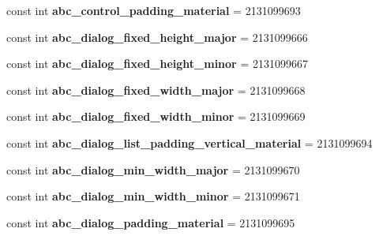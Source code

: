 \begin{DoxyCompactItemize}
const int {\bfseries abc\+\_\+control\+\_\+padding\+\_\+material} = 2131099693
\item 
\mbox{\label{classXaria_1_1Resource_1_1Dimension_a78b26df6c32795a79d6bf8ed56660889}} 
const int {\bfseries abc\+\_\+dialog\+\_\+fixed\+\_\+height\+\_\+major} = 2131099666
\item 
\mbox{\label{classXaria_1_1Resource_1_1Dimension_acc1848f42624bc33325a4bb517004e51}} 
const int {\bfseries abc\+\_\+dialog\+\_\+fixed\+\_\+height\+\_\+minor} = 2131099667
\item 
\mbox{\label{classXaria_1_1Resource_1_1Dimension_a1d492d1410acce7e4bc8ad8d3e0eb8c7}} 
const int {\bfseries abc\+\_\+dialog\+\_\+fixed\+\_\+width\+\_\+major} = 2131099668
\item 
\mbox{\label{classXaria_1_1Resource_1_1Dimension_a225f96fe47a548c9e10a2fa9ec41f659}} 
const int {\bfseries abc\+\_\+dialog\+\_\+fixed\+\_\+width\+\_\+minor} = 2131099669
\item 
\mbox{\label{classXaria_1_1Resource_1_1Dimension_ad1b790c1e02ace96e760c2a6f965abef}} 
const int {\bfseries abc\+\_\+dialog\+\_\+list\+\_\+padding\+\_\+vertical\+\_\+material} = 2131099694
\item 
\mbox{\label{classXaria_1_1Resource_1_1Dimension_ac0773d0fc00b79d048d3f7c075cfec54}} 
const int {\bfseries abc\+\_\+dialog\+\_\+min\+\_\+width\+\_\+major} = 2131099670
\item 
\mbox{\label{classXaria_1_1Resource_1_1Dimension_ae386a7d3a227c0f64611ac610da586a9}} 
const int {\bfseries abc\+\_\+dialog\+\_\+min\+\_\+width\+\_\+minor} = 2131099671
\item 
\mbox{\label{classXaria_1_1Resource_1_1Dimension_aa2aa1e0312bf0bf5a904e7040881e1ea}} 
const int {\bfseries abc\+\_\+dialog\+\_\+padding\+\_\+material} = 2131099695
\item 
\mbox{\label{classXaria_1_1Resource_1_1Dimension_a05daa0aaf93e4057fef98c13603d5a8b}} 

\end{DoxyCompactItemize}
